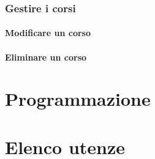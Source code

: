 \documentclass [a4paper,11pt]{book}
\begin{document}
\subsection{Gestire i corsi}

\subsubsection{Modificare un corso}

\medskip

\subsubsection{Eliminare un corso}

\medskip
\medskip

\chapter{Programmazione}

\chapter{Elenco utenze}
\end{document}
